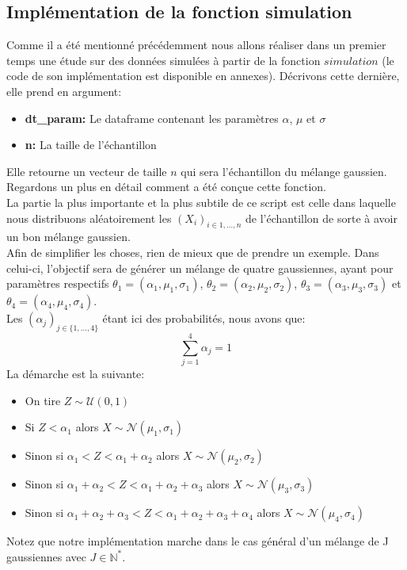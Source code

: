\documentclass[a4paper,french,10pt]{article}
\begin{document}
\subsection{Implémentation de la fonction simulation}
Comme il a été mentionné précédemment nous allons réaliser dans un premier temps une étude sur des données simulées à partir de la fonction $simulation$ (le code de son implémentation est disponible en annexes). Décrivons cette dernière, elle prend en argument:
\begin{itemize}
	\item \textbf{dt\_param:} Le dataframe contenant les paramètres $\alpha$, $\mu$ et $\sigma$
	\item \textbf{n:} La taille de l'échantillon
\end{itemize}
Elle retourne un vecteur de taille $n$ qui sera l'échantillon du mélange gaussien. \\ Regardons un plus en détail comment a été conçue cette fonction. \\
La partie la plus importante et la plus subtile de ce script est celle dans laquelle nous distribuons aléatoirement les $(X_i)_{i \in 1,\dots,n}$ de l'échantillon de sorte à avoir un bon mélange gaussien. \\
Afin de simplifier les choses, rien de mieux que de prendre un exemple. Dans celui-ci, l'objectif sera de générer un mélange de quatre gaussiennes, ayant pour paramètres respectifs $\theta_1 = (\alpha_1, \mu_1, \sigma_1)$, $\theta_2 = (\alpha_2, \mu_2, \sigma_2)$, $\theta_3 = (\alpha_3, \mu_3, \sigma_3)$ et $\theta_4 = (\alpha_4, \mu_4, \sigma_4)$. \\
Les $(\alpha_j)_{j \in \{1,\dots,4\}}$ étant ici des probabilités, nous avons que:
\[
	\sum_{j=1}^{4} \alpha_{j} = 1
\]
La démarche est la suivante:
\begin{itemize}
	\item On tire $Z \sim \mathcal{U}(0,1)$
	\item Si $Z < \alpha_1$ alors $X \sim \mathcal{N}(\mu_1, \sigma_1)$
	\item Sinon si $\alpha_1 < Z < \alpha_1 + \alpha_2$ alors $X \sim \mathcal{N}(\mu_2, \sigma_2)$
	\item Sinon si $\alpha_1 + \alpha_2 < Z < \alpha_1 + \alpha_2 + \alpha_3$ alors $X \sim \mathcal{N}(\mu_3, \sigma_3)$
	\item Sinon si $\alpha_1 + \alpha_2 + \alpha_3 < Z < \alpha_1 + \alpha_2 + \alpha_3 + \alpha_4$ alors $X \sim \mathcal{N}(\mu_4, \sigma_4)$
\end{itemize}
Notez que notre implémentation marche dans le cas général d'un mélange de J gaussiennes avec $J \in \mathbb{N}^{*}$.
\end{document}
